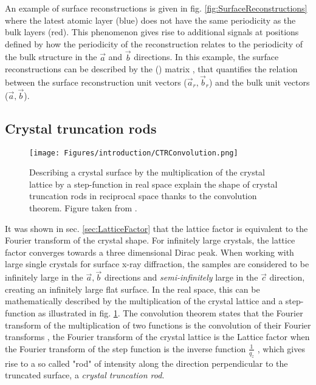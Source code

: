 An example of surface reconstructions is given in fig. \ref{fig:SurfaceReconstructions} where the latest atomic layer (blue) does not have the same periodicity as the bulk layers (red).
This phenomenon gives rise to additional signals at positions defined by how the periodicity of the reconstruction relates to the periodicity of the bulk structure in the $\vec{a}$ and $\vec{b}$ directions.
In this example, the surface reconstructions can be described by the () matrix \parencite{Wood1964}, that quantifies the relation between the surface reconstruction unit vectors ($\vec{a}_r, \vec{b}_r$) and the bulk unit vectors ($\vec{a}, \vec{b}$).

\subsection{Crystal truncation rods} \label{sec:CTR}

\begin{figure}[!htb]
    \centering
    \texttt{[image: Figures/introduction/CTRConvolution.png]}
    \caption{
    Describing a crystal surface by the multiplication of the crystal lattice by a step-function in real space explain the shape of crystal truncation rods in reciprocal space thanks to the convolution theorem.
    Figure taken from \cite{Willmott}.
    }
    \label{fig:CTRConvolution}
\end{figure}

It was shown in sec. \ref{sec:LatticeFactor} that the lattice factor is equivalent to the Fourier transform of the crystal shape.
For infinitely large crystals, the lattice factor converges towards a three dimensional Dirac peak.
When working with large single crystals for surface x-ray diffraction, the samples are considered to be infinitely large in the $\vec{a}, \vec{b}$ directions and \textit{semi-infinitely} large in the $\vec{c}$ direction, creating an infinitely large flat surface.
In the real space, this can be mathematically described by the multiplication of the crystal lattice and a step-function as illustrated in fig. \ref{fig:CTRConvolution}.
The convolution theorem states that the Fourier transform of the multiplication of two functions is the convolution of their Fourier transforms \parencite{Mcalister2003}, the Fourier transform of the crystal lattice is the Lattice factor when the Fourier transform of the step function is the inverse function $\frac{1}{q_z}$ \parencite{Andrews1985, Robinson1986}, which gives rise to a so called "rod" of intensity along the direction perpendicular to the truncated surface, a \textit{crystal truncation rod}.

